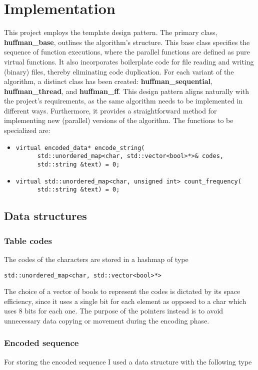 \documentclass{article}
\begin{document}
\section{Implementation}
This project employs the template design pattern. The primary class, \textbf{huffman\_base}, outlines the algorithm's structure.
This base class specifies the sequence of function executions, where the parallel functions are defined as pure virtual functions.
It also incorporates boilerplate code for file reading and writing (binary) files, thereby eliminating code duplication.
For each variant of the algorithm, a distinct class has been created: \textbf{huffman\_sequential}, \textbf{huffman\_thread}, and \textbf{huffman\_ff}.
This design pattern aligns naturally with the project's requirements, as the same algorithm needs to be implemented in different ways.
Furthermore, it provides a straightforward method for implementing new (parallel) versions of the algorithm.
The functions to be specialized are:
\begin{itemize}
    \item \begin{verbatim}
virtual encoded_data* encode_string(
      std::unordered_map<char, std::vector<bool>*>& codes,
      std::string &text) = 0;
\end{verbatim}
    \item \begin{verbatim}
virtual std::unordered_map<char, unsigned int> count_frequency(
      std::string &text) = 0;
    \end{verbatim}
\end{itemize}

\subsection{Data structures}
\subsubsection{Table codes}
The codes of the characters are stored in a hashmap of type
\begin{verbatim}
std::unordered_map<char, std::vector<bool>*>
\end{verbatim}
The choice of a vector of bools to represent the codes is dictated by its space efficiency, since it uses a single bit for each element
as opposed to a char which uses 8 bits for each one.
The purpose of the pointers instead is to avoid unnecessary data copying or movement during the encoding phase.
\subsubsection{Encoded sequence}
For storing the encoded sequence I used a data structure with the following type
\end{document}
